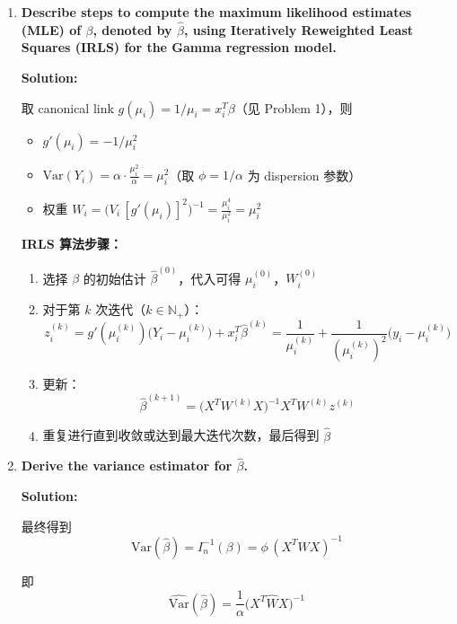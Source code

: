 \begin{enumerate}
\item[(a)] \textbf{Describe steps to compute the maximum likelihood estimates (MLE) of $\beta$, denoted by $\hat{\beta}$, using Iteratively Reweighted Least Squares (IRLS) for the Gamma regression model.}

\textbf{Solution:}

取 canonical link $g(\mu_i) = 1/\mu_i = x_i^T\beta$（见 Problem 1），则

\begin{itemize}
\item $g'(\mu_i) = -1/\mu_i^2$
\item $\text{Var}(Y_i) = \alpha\cdot\frac{\mu_i^2}{\alpha} = \mu_i^2$（取 $\phi = 1/\alpha$ 为 dispersion 参数）
\item 权重 $W_i = \bigl(V_i\,[g'(\mu_i)]^2\bigr)^{-1} = \frac{\mu_i^4}{\mu_i^2} = \mu_i^2$
\end{itemize}

\textbf{IRLS 算法步骤：}

\begin{enumerate}
\item 选择 $\beta$ 的初始估计 $\hat{\beta}^{(0)}$，代入可得 $\mu_i^{(0)}$，$W_i^{(0)}$

\item 对于第 $k$ 次迭代（$k\in\mathbb{N}_+$）：
  \[
  z_i^{(k)} = g'(\mu_i^{(k)})\bigl(Y_i - \mu_i^{(k)}\bigr) + x_i^T\hat{\beta}^{(k)}
  = \frac{1}{\mu_i^{(k)}} + \frac{1}{(\mu_i^{(k)})^2}\bigl(y_i - \mu_i^{(k)}\bigr)
  \]

\item 更新：
  \[
  \hat{\beta}^{(k+1)} = \bigl(X^T W^{(k)} X\bigr)^{-1} X^T W^{(k)} z^{(k)}
  \]

\item 重复进行直到收敛或达到最大迭代次数，最后得到 $\hat{\beta}$
\end{enumerate}

\bigskip

\item[(b)] \textbf{Derive the variance estimator for $\hat{\beta}$.}

\textbf{Solution:}

最终得到
\[
\text{Var}(\hat{\beta}) = I_n^{-1}(\beta) = \phi\,(X^T W X)^{-1}
\]

即
\[
\boxed{\widehat{\text{Var}}(\hat{\beta}) = \frac{1}{\alpha}\bigl(X^T \hat{W} X\bigr)^{-1}}
\]

\end{enumerate}

